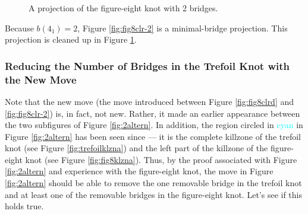 \documentclass[titlepage,11pt]{article}
\begin{document}
\begin{figure}[h!]
    \centering
    \caption{A projection of the figure-eight knot with 2 bridges.}
    \label{fig:fig8fin}
\end{figure}

Because $b(4_1)=2$, Figure \ref{fig:fig8clr-2} is a minimal-bridge projection. This projection is cleaned up in Figure \ref{fig:fig8fin}.


\subsubsection{Reducing the Number of Bridges in the Trefoil Knot with the New Move}\label{ss2:trefoilreduce-2}
Note that the new move (the move introduced between Figure \ref{fig:fig8clrd} and \ref{fig:fig8clr-2}) is, in fact, not new. Rather, it made an earlier appearance between the two subfigures of Figure \ref{fig:2altern}. In addition, the region circled in \textcolor{cyan}{cyan} in Figure \ref{fig:2altern} has been seen since --- it is the complete killzone of the trefoil knot (see Figure \ref{fig:trefoilklzna}) and the left part of the killzone of the figure-eight knot (see Figure \ref{fig:fig8klzna}). Thus, by the proof associated with Figure \ref{fig:2altern} and experience with the figure-eight knot, the move in Figure \ref{fig:2altern} should be able to remove the one removable bridge in the trefoil knot and at least one of the removable bridges in the figure-eight knot. Let's see if this holds true.\par
\end{document}
